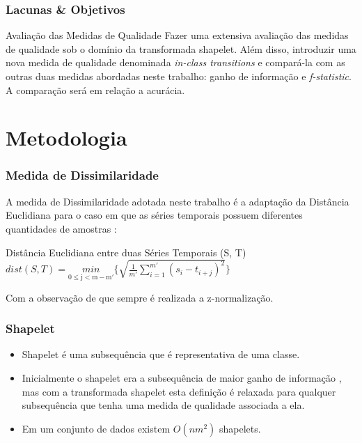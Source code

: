 \documentclass{beamer}
\begin{document}

\begin{frame}
\frametitle{Lacunas \& Objetivos}
\begin{block}{Avalia{\c c}{\~a}o das Medidas de Qualidade}
Fazer uma extensiva avalia{\c c}{\~a}o das medidas de qualidade sob o dom{\'i}nio da transformada shapelet. Al{\'e}m disso, introduzir uma nova medida de qualidade denominada \textit{in-class transitions} e compar{\'a}-la com as outras duas medidas abordadas neste trabalho: ganho de informa{\c c}{\~a}o e \textit{f-statistic}. A compara{\c c}{\~a}o ser{\'a} em rela{\c c}{\~a}o a acur{\'a}cia.
\end{block}
\end{frame}

\section{Metodologia}


\begin{frame}
\frametitle{Medida de Dissimilaridade}

A medida de Dissimilaridade adotada neste trabalho {\'e} a adapta{\c c}{\~a}o da Dist{\^a}ncia Euclidiana para o caso em que as s{\'e}ries temporais possuem diferentes quantidades de amostras \cite{Ye:2009do}:

\begin{block}{Dist{\^a}ncia Euclidiana entre duas S{\'e}ries Temporais (S, T)}
$dist(S, T) = \underset{\mathrm{0 \leq j < m - m'}}{min} \Bigg\{ \sqrt{\frac{1}{m'}\sum_{i = 1}^{m'}(s_{i} - t_{i + j})^{2}} \Bigg\}$
\end{block}

Com a observa{\c c}{\~a}o de que sempre {\'e} realizada a z-normaliza{\c c}{\~a}o.
\end{frame}


\begin{frame}
\frametitle{Shapelet}

\begin{itemize}
\item Shapelet {\'e} uma subsequ{\^e}ncia que {\'e} representativa de uma classe.
\item Inicialmente o shapelet era a subsequ{\^e}ncia de maior ganho de informa{\c c}{\~a}o \cite{Ye:2009do}, mas com a transformada shapelet esta defini{\c c}{\~a}o {\'e} relaxada para qualquer subsequ{\^e}ncia que tenha uma medida de qualidade associada a ela.
\item Em um conjunto de dados existem $O(nm^{2})$ shapelets.
\end{itemize}
\end{frame}
\end{document}
